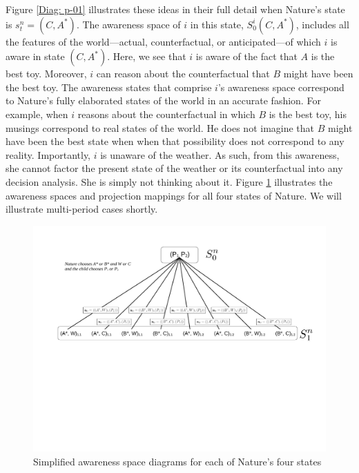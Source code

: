 \documentclass[
11pt,
titlepage,
reqno,
]{article}%
\theoremstyle{definition}
\begin{document}
Figure \ref{Diag: p-01} illustrates these ideas in their full detail when Nature's state is $s^n_t=(C,A^\ast)$. 
The awareness space of $i$ in this state, $S^i_0(C,A^\ast)$, includes all the features of the world---actual, counterfactual, or anticipated---of which $i$ is aware in state $(C,A^\ast)$. 
Here, we see that $i$ is aware of the fact that $A$ is the best toy. 
Moreover, $i$ can reason about the counterfactual that $B$ might have been the best toy. 
The awareness states that comprise $i$'s awareness space correspond to Nature's fully elaborated states of the world in an accurate fashion. 
For example, when $i$ reasons about the counterfactual in which $B$ is the best toy, his musings correspond to real states of the world. 
He does not imagine that $B$ might have been the best state when when that possibility does not correspond to any reality. 
Importantly, $i$ is unaware of the weather. 
As such, from this awareness, she cannot factor the present state of the weather or its counterfactual into any decision analysis. 
She is simply not thinking about it. 
Figure \ref{Diag: p-03} illustrates the awareness spaces and projection mappings for all four states of Nature. 
We will illustrate multi-period cases shortly.

\begin{figure}[h!]
	\centering
	\includegraphics*[page=3,trim = 0in 0in 0in 0in,scale=.6]{Awareness_Diagrams_All}
	\caption{Simplified awareness space diagrams for each of Nature's four states\label{Diag: p-03}}%
\end{figure}
	
\end{document}
